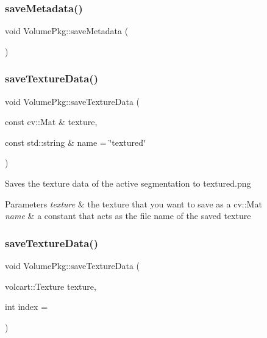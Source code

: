 \subsubsection{\texorpdfstring{save\+Metadata()}{saveMetadata()}\hspace{0.1cm}{\footnotesize\ttfamily [2/2]}}
{\footnotesize\ttfamily void Volume\+Pkg\+::save\+Metadata (\begin{DoxyParamCaption}{ }\end{DoxyParamCaption})}

\hypertarget{classVolumePkg_ad13a7fb165caa0d3537942907a3e3cad}{}\label{classVolumePkg_ad13a7fb165caa0d3537942907a3e3cad} 
\subsubsection{\texorpdfstring{save\+Texture\+Data()}{saveTextureData()}\hspace{0.1cm}{\footnotesize\ttfamily [1/2]}}
{\footnotesize\ttfamily void Volume\+Pkg\+::save\+Texture\+Data (\begin{DoxyParamCaption}\item[{const cv\+::\+Mat \&}]{texture,  }\item[{const std\+::string \&}]{name = {\ttfamily \char`\"{}textured\char`\"{}} }\end{DoxyParamCaption})}

Saves the texture data of the active segmentation to textured.\+png 
\begin{DoxyParams}{Parameters}
{\em texture} & the texture that you want to save as a cv\+::\+Mat \\
\hline
{\em name} & a constant that acts as the file name of the saved texture \\
\hline
\end{DoxyParams}
\hypertarget{classVolumePkg_a47e37208ab713dbc8d72b5e7f71636f4}{}\label{classVolumePkg_a47e37208ab713dbc8d72b5e7f71636f4} 
\subsubsection{\texorpdfstring{save\+Texture\+Data()}{saveTextureData()}\hspace{0.1cm}{\footnotesize\ttfamily [2/2]}}
{\footnotesize\ttfamily void Volume\+Pkg\+::save\+Texture\+Data (\begin{DoxyParamCaption}\item[{volcart\+::\+Texture}]{texture,  }\item[{int}]{index = {} }\end{DoxyParamCaption})\hspace{0.3cm}{\ttfamily [inline]}}

